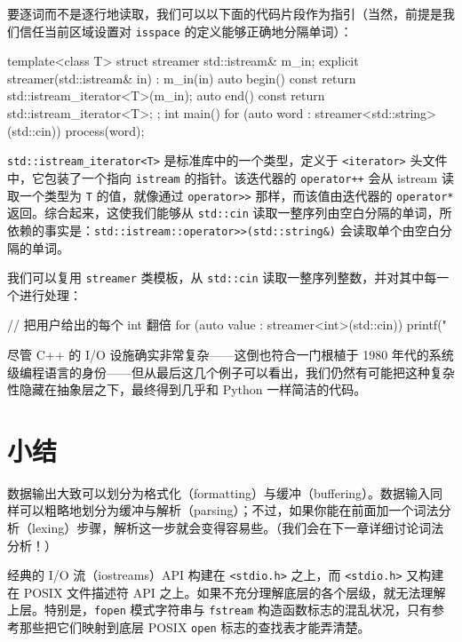 要逐词而不是逐行地读取，我们可以以下面的代码片段作为指引（当然，前提是我们信任当前区域设置对 \texttt{isspace} 的定义能够正确地分隔单词）：

\begin{codebox}[cpp]
     template<class T>
     struct streamer {
       std::istream& m_in;
       explicit streamer(std::istream& in) : m_in(in) {}
       auto begin() const
         { return std::istream_iterator<T>(m_in); }
       auto end() const
         { return std::istream_iterator<T>{}; }
     };
     int main()
     {
       for (auto word : streamer<std::string>(std::cin)) {
         process(word);
       }
     }
\end{codebox}

\texttt{std::\allowbreak{}istream\_\allowbreak{}iterator<\allowbreak{}T>\allowbreak{}} 是标准库中的一个类型，定义于 \texttt{<iterator>\allowbreak{}} 头文件中，它包装了一个指向 \texttt{istream} 的指针。该迭代器的 \texttt{operator++} 会从 istream 读取一个类型为 \texttt{T} 的值，就像通过 \texttt{operator>\allowbreak{}>} 那样，而该值由迭代器的 \texttt{operator*} 返回。综合起来，这使我们能够从 \texttt{std::\allowbreak{}cin} 读取一整序列由空白分隔的单词，所依赖的事实是：\texttt{std::\allowbreak{}istream::\allowbreak{}operator>\allowbreak{}>(\allowbreak{}std::\allowbreak{}string\&)\allowbreak{}} 会读取单个由空白分隔的单词。

我们可以复用 \texttt{streamer} 类模板，从 \texttt{std::\allowbreak{}cin} 读取一整序列整数，并对其中每一个进行处理：

\begin{codebox}[cpp]
     // 把用户给出的每个 int 翻倍
     for (auto value : streamer<int>(std::cin)) {
       printf("%
     }
\end{codebox}

尽管 C++ 的 I/O 设施确实非常复杂——这倒也符合一门根植于 1980 年代的系统级编程语言的身份——但从最后这几个例子可以看出，我们仍然有可能把这种复杂性隐藏在抽象层之下，最终得到几乎和 Python 一样简洁的代码。

\section{小结}

数据输出大致可以划分为格式化（formatting）与缓冲（buffering）。数据输入同样可以粗略地划分为缓冲与解析（parsing）；不过，如果你能在前面加一个词法分析（lexing）步骤，解析这一步就会变得容易些。（我们会在下一章详细讨论词法分析！）

经典的 I/O 流（iostreams）API 构建在 \texttt{<stdio.\allowbreak{}h>\allowbreak{}} 之上，而 \texttt{<stdio.\allowbreak{}h>\allowbreak{}} 又构建在 POSIX 文件描述符 API 之上。如果不充分理解底层的各个层级，就无法理解上层。特别是，\texttt{fopen} 模式字符串与 \texttt{fstream} 构造函数标志的混乱状况，只有参考那些把它们映射到底层 POSIX \texttt{open} 标志的查找表才能弄清楚。


